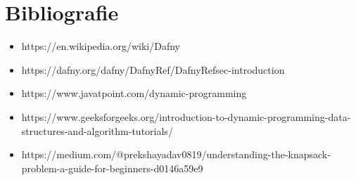 \chapter*{Bibliografie} 

\begin{itemize}
    \item https://en.wikipedia.org/wiki/Dafny
    \item https://dafny.org/dafny/DafnyRef/DafnyRef{\texthash}sec-introduction
    \item https://www.javatpoint.com/dynamic-programming
    \item https://www.geeksforgeeks.org/introduction-to-dynamic-programming-data-structures-and-algorithm-tutorials/
    \item https://medium.com/@prekshayadav0819/understanding-the-knapsack-problem-a-guide-for-beginners-d0146a59e9
\end{itemize}